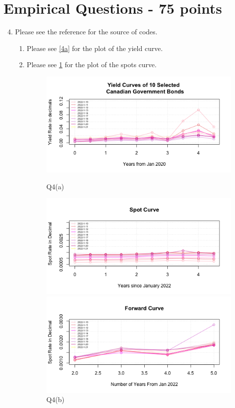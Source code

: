 \documentclass{article}
\begin{document}
\section*{Empirical Questions - 75 points} 

\begin{enumerate}
\setcounter{enumi}{3} 
    \item Please see the reference for the source of codes.
    \begin{enumerate}
        \item Please see \ref{4a} for the plot of the yield curve.
        \item Please see \ref{4b} for the plot of the spots curve.
            \begin{figure}
            \centerline{\includegraphics{YTM.png}}
            \caption{Q4(a)}
            \label{4a}
            \centerline{\includegraphics{SPOT.png}}
            \caption{Q4(b)}
            \label{4b}
            \centerline{\includegraphics{Forward.png}}

\end{figure}
\end{enumerate}
\end{enumerate}
\end{document}
